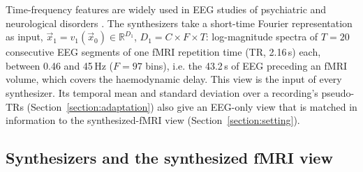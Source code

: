 \documentclass[pdflatex,referee,sn-basic]{sn-jnl}%
\begin{document}
Time-frequency features are widely used in EEG studies of psychiatric and neurological disorders \cite{fingelkurts2007impaired,burgess2002functional,albrecht2018time,roach2008event,bates2009low}. The synthesizers take a short-time Fourier representation \cite{jacobsen2003sliding} as input, $\vec{x}_1 = v_1(\vec{x}_0) \in \mathbb{R}^{D_1}$, $D_1 = C \times F \times T$: log-magnitude spectra of $T=20$ consecutive EEG segments of one fMRI repetition time (TR, 2.16\,s) each, between 0.46 and 45\,Hz ($F=97$ bins), i.e. the 43.2\,s of EEG preceding an fMRI volume, which covers the haemodynamic delay. This view is the input of every synthesizer. Its temporal mean and standard deviation over a recording's pseudo-TRs (Section~\ref{section:adaptation}) also give an EEG-only view that is matched in information to the synthesized-fMRI view (Section~\ref{section:setting}).

\subsection{Synthesizers and the synthesized fMRI view}\label{eeg_views:eeg_to_fmri}
\end{document}
